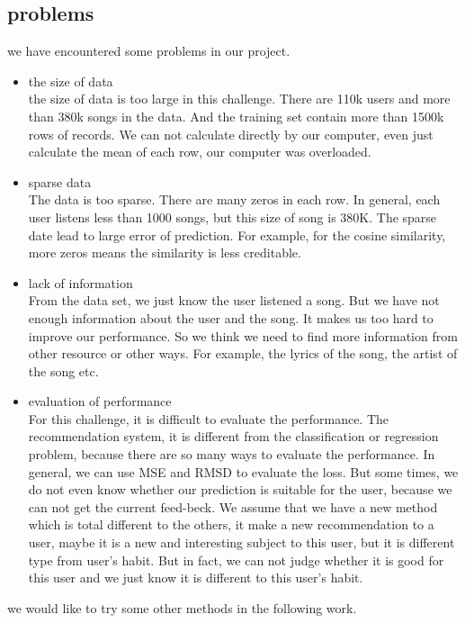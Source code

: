 \documentclass{article}
\begin{document}
\subsection{problems}
we have encountered some problems in our project.
\begin{itemize}
\item  the size of data\\
the size of data is too large in this challenge. There are  110k users and more than 380k songs in the data. And the training set contain more than 1500k rows of records. We can not calculate directly by our computer, even just calculate the mean of each row, our computer was overloaded. 
\item  sparse data\\
The data is too sparse. There are many zeros in each row. In general, each user listens less than 1000 songs, but this size of song is 380K. The sparse date lead to  large error of prediction. For example, for the cosine similarity, more zeros means the similarity is less creditable. 
\item lack of information\\
From the data set, we just know the user listened a song. But we have not enough information about the  user and the song. It makes us too hard to improve our performance. So we think we need to find more information from other resource or other ways. For example, the lyrics of the song, the artist of the song etc. 
\item evaluation of performance\\
For this challenge, it is difficult to evaluate the performance. The recommendation system, it is different from the classification or regression problem, because there are so many ways to evaluate the performance. In general, we can use MSE and RMSD to evaluate the loss. But some times, we do not even know whether our prediction is suitable for the user, because we can not get the current feed-beck. We assume that we have a new method which is total different to the others, it make a new recommendation to a user, maybe it is a new and interesting subject to this user, but it is different type from user's habit. But in fact, we can not judge whether it is good for this user and we just know it is different to this user's habit. 
\end{itemize}
we would like to try some other methods in the following work.
\end{document}
